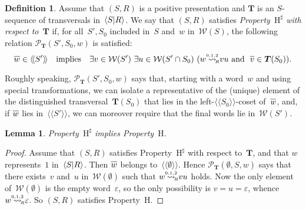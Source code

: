 \documentclass{amsart}
\numberwithin{equation}{section}
\theoremstyle{plain}
\newtheorem{lemm}[prop]{Lemma}
\theoremstyle{definition}
\newtheorem{defi}[prop]{Definition}
\begin{document}
\begin{defi}
\label{D:Propp}
Assume that $({S}, {R})$ is a positive presentation and ${\boldsymbol{T}}$ is an ${S}$-sequence of transversals in~${\langle{S}{\mid}\nobreak{R}\rangle}$. We say that $({S}, {R})$ satisfies \emph{Property~${{\mathrm{H}}^\sharp}$ with respect to~${\boldsymbol{T}}$} if, for all~${S}', {S}_0$ included in~${S}$ and~${w}$ in~${\mathcal{W}({S})}$, the following relation ${\mathcal{P}}_{\boldsymbol{T}}({S}', {S}_0, {w})$ is satisfied:
\begin{equation}
{\overline{\vrule width0pt height5pt{w}}} \in {\langle\!\langle{{{S}'}}\rangle\!\rangle} \quad \mbox{implies} \quad \exists {v} \in {\mathcal{W}({{S}'})} \ \exists {u} \in {\mathcal{W}({{S}' \cap {S}_0})} \ ({w} {\mathrel{{\mathrel{\overset{\scriptscriptstyle 0,1,2}{\rightsquigarrow}}}_{\hspace{-0.9ex}{\scriptscriptstyle R}}}} {v} {u} \mbox{\ and \ } {\overline{\vrule width0pt height5pt{v}}} \in {\boldsymbol{T}}({S}_0)).
\end{equation}
\end{defi}

Roughly speaking, ${\mathcal{P}}_{\boldsymbol{T}}({S}', {S}_0, {w})$ says that, starting with a word~${w}$ and using special transformations, we can isolate a representative of the (unique) element of the distinguished transversal~${\boldsymbol{T}}({S}_0)$ that lies in the left-${\langle\!\langle{{{S}_0}}\rangle\!\rangle}$-coset of~${\overline{\vrule width0pt height5pt{w}}}$, and, if ${\overline{\vrule width0pt height5pt{w}}}$ lies in~${\langle\!\langle{{{S}'}}\rangle\!\rangle}$, we can moreover require that the final words lie in~${\mathcal{W}({{S}'})}$. 

\begin{lemm}
\label{L:Implies}
Property~${{\mathrm{H}}^\sharp}$ implies Property~${\mathrm{H}}$.
\end{lemm}

\begin{proof}
Assume that $({S}, {R})$ satisfies Property~${{\mathrm{H}}^\sharp}$ with respect to~${\boldsymbol{T}}$, and that ${w}$ represents~$1$ in~${\langle{S}{\mid}\nobreak{R}\rangle}$. Then ${\overline{\vrule width0pt height5pt{w}}}$ belongs to~${\langle\!\langle{{\emptyset}}\rangle\!\rangle}$. Hence ${\mathcal{P}}_{\boldsymbol{T}}(\emptyset, {S}, {w})$ says that there exists~${v}$ and~${u}$ in~${\mathcal{W}({\emptyset})}$ such that ${w} {\mathrel{{\mathrel{\overset{\scriptscriptstyle 0,1,2}{\rightsquigarrow}}}_{\hspace{-0.9ex}{\scriptscriptstyle R}}}} {v} {u}$ holds. Now the only element of~${\mathcal{W}({\emptyset})}$ is the empty word~${\varepsilon}$, so the only possibility is ${v} = {u} = {\varepsilon}$, whence ${w} {\mathrel{{\mathrel{\overset{\scriptscriptstyle 0,1,2}{\rightsquigarrow}}}_{\hspace{-0.9ex}{\scriptscriptstyle R}}}} {\varepsilon}$. So $({S}, {R})$ satisfies Property~${\mathrm{H}}$.
\end{proof}
\end{document}
